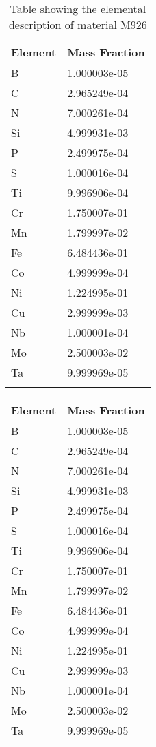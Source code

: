 \begin{centering}
\begin{longtable}[ht!]
\caption{Table showing the elemental description of material M922}
\label{table:material_EppDT}
\end{longtable}
\clearpage

\begin{longtable}[ht!]
{ p{} | p{} }
\hline
Element & Mass Fraction\\
\hline
B &  1.000003e-05\\
C &  2.965249e-04\\
N &  7.000261e-04\\
Si &  4.999931e-03\\
P &  2.499975e-04\\
S &  1.000016e-04\\
Ti &  9.996906e-04\\
Cr &  1.750007e-01\\
Mn &  1.799997e-02\\
Fe &  6.484436e-01\\
Co &  4.999999e-04\\
Ni &  1.224995e-01\\
Cu &  2.999999e-03\\
Nb &  1.000001e-04\\
Mo &  2.500003e-02\\
Ta &  9.999969e-05\\

\caption{Table showing the elemental description of material M926}
\label{table:material_PPWheels}
\end{longtable}
\clearpage

\begin{longtable}[ht!]
{ p{} | p{} }
\hline
Element & Mass Fraction\\
\hline
B &  1.000003e-05\\
C &  2.965249e-04\\
N &  7.000261e-04\\
Si &  4.999931e-03\\
P &  2.499975e-04\\
S &  1.000016e-04\\
Ti &  9.996906e-04\\
Cr &  1.750007e-01\\
Mn &  1.799997e-02\\
Fe &  6.484436e-01\\
Co &  4.999999e-04\\
Ni &  1.224995e-01\\
Cu &  2.999999e-03\\
Nb &  1.000001e-04\\
Mo &  2.500003e-02\\
Ta &  9.999969e-05\\


\end{longtable}
\end{centering}
